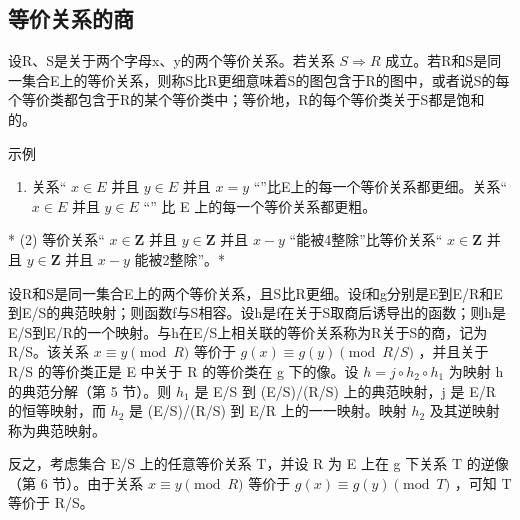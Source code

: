 \subsection{等价关系的商}

设R、S是关于两个字母x、y的两个等价关系。若关系 \(S \Longrightarrow R\) 成立。若R和S是同一集合E上的等价关系，则称S比R更细意味着S的图包含于R的图中，或者说S的每个等价类都包含于R的某个等价类中；等价地，R的每个等价类关于S都是饱和的。

示例

\begin{enumerate}
\def\labelenumi{(\arabic{enumi})}
\tightlist
\item
  关系“ \(x \in E\) 并且 \(y \in E\) 并且 \(x = y\) “”比E上的每一个等价关系都更细。关系“ \(x \in E\) 并且 \(y \in E\) “” 比 E 上的每一个等价关系都更粗。
\end{enumerate}

* (2) 等价关系“ \(x \in \mathbf{Z}\) 并且 \(y \in \mathbf{Z}\) 并且 \(x - y\) “能被4整除”比等价关系“ \(x \in \mathbf{Z}\) 并且 \(y \in \mathbf{Z}\) 并且 \(x - y\) 能被2整除''。*

设R和S是同一集合E上的两个等价关系，且S比R更细。设f和g分别是E到E/R和E到E/S的典范映射；则函数f与S相容。设h是f在关于S取商后诱导出的函数；则h是E/S到E/R的一个映射。与h在E/S上相关联的等价关系称为R关于S的商，记为R/S。该关系 \(x \equiv y \pmod{R}\) 等价于 \(g(x) \equiv g(y) \pmod{R/S}\) ，并且关于 R/S 的等价类正是 E 中关于 R 的等价类在 g 下的像。设 \(h = j \circ h_{2} \circ h_{1}\) 为映射 h 的典范分解（第 5 节）。则 \(h_{1}\) 是 E/S 到 (E/S)/(R/S) 上的典范映射，j 是 E/R 的恒等映射，而 \(h_{2}\) 是 (E/S)/(R/S) 到 E/R 上的一一映射。映射 \(h_{2}\) 及其逆映射称为典范映射。

反之，考虑集合 E/S 上的任意等价关系 T，并设 R 为 E 上在 g 下关系 T 的逆像（第 6 节）。由于关系 \(x \equiv y \pmod{R}\) 等价于 \(g(x) \equiv g(y) \pmod{T}\) ，可知 T 等价于 R/S。


